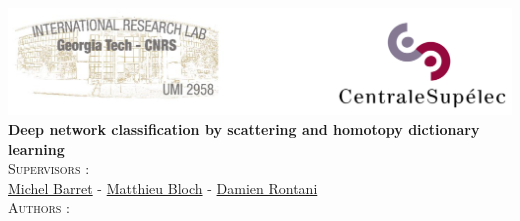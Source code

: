 \documentclass{article}
\author{\Large \textsc{\href{mailto:ahmed.benaissa@supelec.fr}{Ahmed Ben Aissa} - \href{mailto:elie.mokbel@supelec.fr}{Elie Mokbel} - \href{mailto:mohammed.fellaji@supelec.fr}{Mohammed Fellaji}}}
\date{\today}
\begin{document}
\hypersetup{pdfborder=0 0 0} 		%


\makeatletter
  \begin{titlepage}
  \centering
     {\large \textsc{   }}\\
    \centering
      \includegraphics[width=1 \textwidth]{figures/logo.png} \\
    \vspace{3cm}
      {\LARGE\textbf{Deep network classification by scattering and homotopy dictionary learning}\\
    \vspace{3cm}
    \centering
     {\Large \textsc{Supervisors : }}\\  
      {\href{mailto:michel.barret@centralesupelec.fr}{Michel Barret}  - \href{mailto:matthieu.bloch@ece.gatech.edu}{Matthieu Bloch} - \href{mailto:damien.rontani@centralesupelec.fr}{Damien Rontani} } \\
     \vspace{2em}
     	{\large \textsc{Authors : }}\\
        {\Large \@author} \\
        \vspace{4em}
        {\Large \@date} }\\
  \end{titlepage}
 
 
\makeatother

\tableofcontents





\newpage
\nocite{*}    %

\end{document}
